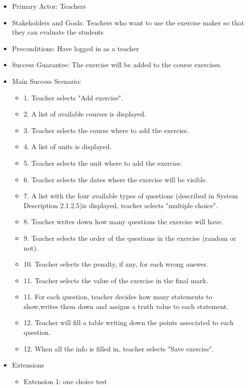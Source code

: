 \documentclass{article}
\begin{document}
\begin{enumerate}
\begin{enumerate}
\begin{enumerate}
			\begin{itemize}
				\item Primary Actor: Teachers
				\item Stakeholders and Goals: Teachers who want to use the exercise maker so that they can evaluate the students
				\item Preconditions: Have logged in as a teacher
				\item Success Guarantee: The exercise will be added to the course exercises.
				\item Main Success Scenario:
				\begin{itemize}
					\item 1. Teacher selects "Add exercise".
					\item 2. A list of available courses is displayed.
					\item 3. Teacher selects the course where to add the exercise.
					\item 4. A list of units is displayed.
					\item 5. Teacher selects the unit where to add the exercise.
					\item 6. Teacher selects the dates where the exercise will be visible.
					\item 7. A list with the four available types of questions (described in System Description 2.1.2.5)is displayed, teacher selects "multiple choice".
					\item 8. Teacher writes down how many questions the exercise will have.
					\item 9. Teacher selects the order of the questions in the exercise (random or not).
					\item 10. Teacher selects the penalty, if any, for each wrong answer.
					\item 11. Teacher selects the value of the exercise in the final mark.
					\item 11. For each question, teacher decides how many statements to show,writes them down and assigns a truth value to each statement.
					\item 12. Teacher will fill a table writing down the points associated to each question.
					\item 12. When all the info is filled in, teacher selects "Save exercise". 
				\end{itemize}
				\item{Extensions}
				\begin{itemize}
					\item Extension 1: one choice test

\end{itemize}
\end{itemize}
\end{enumerate}
\end{enumerate}
\end{enumerate}
\end{document}
